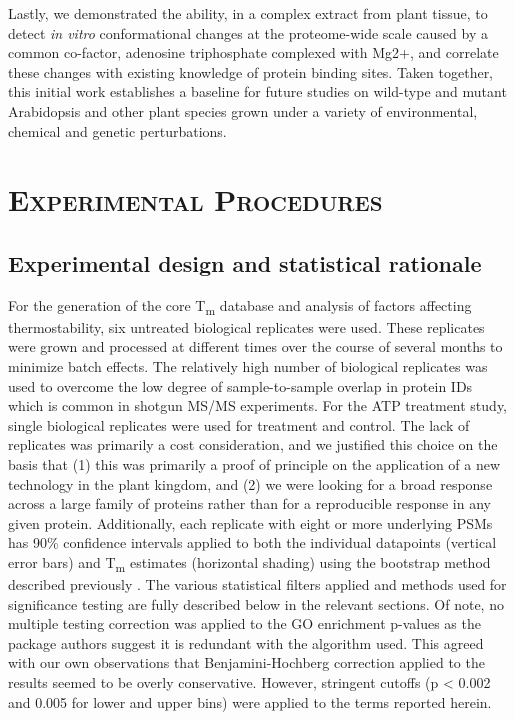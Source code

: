 \documentclass[11pt,letter]{article}\usepackage[]{graphicx}\usepackage[]{color}
\newcommand{\Tm}{T\textsubscript{m}}
\begin{document}
Lastly, we demonstrated the ability, in a complex extract from plant tissue,
to detect \textit{in vitro} conformational changes at the proteome-wide scale
caused by a common co-factor, adenosine triphosphate complexed with Mg2+, and
correlate these changes with existing knowledge of protein binding sites.
Taken together, this initial work establishes a baseline for future studies on
wild-type and mutant Arabidopsis and other plant species grown under a variety
of environmental, chemical and genetic perturbations.


\section*{\textsc{Experimental Procedures}}

\subsection*{Experimental design and statistical rationale}

For the generation of the core \Tm{} database and analysis of factors
affecting thermostability, six untreated biological replicates were used.
These replicates were grown and processed at different times over the course
of several months to minimize batch effects. The relatively high number of
biological replicates was used to overcome the low degree of sample-to-sample
overlap in protein IDs which is common in shotgun MS/MS experiments. For the
ATP treatment study, single biological replicates were used for treatment and
control. The lack of replicates was primarily a cost consideration, and we
justified this choice on the basis that (1) this was primarily a proof of
principle on the application of a new technology in the plant kingdom, and (2)
we were looking for a broad response across a large family of proteins rather
than for a reproducible response in any given protein. Additionally, each
replicate with eight or more underlying PSMs has 90\% confidence intervals
applied to both the individual datapoints (vertical error bars) and \Tm{}
estimates (horizontal shading) using the bootstrap method described previously
\cite{savitski_tracking_2014}. The various statistical filters applied and
methods used for significance testing are fully described below in the
relevant sections. Of note, no multiple testing correction was
applied to the GO enrichment p-values as the package authors suggest it is
redundant with the algorithm used. This agreed with our own observations that
Benjamini-Hochberg correction applied to the results seemed to be overly
conservative. However, stringent cutoffs (p < 0.002 and
0.005 for lower and upper bins) were applied to the
terms reported herein.
\end{document}
